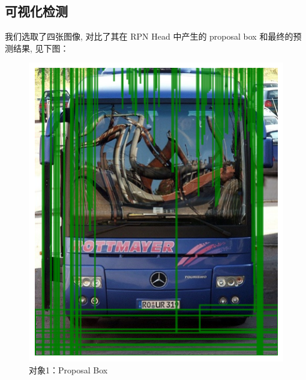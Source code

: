 \documentclass[notitlepage,cs4size,punct,oneside]{ctexrep}
\numberwithin{equation}{chapter}
\theoremstyle{mystyle}
\begin{document}
\subsection{可视化检测}
我们选取了四张图像, 对比了其在 RPN Head 中产生的 proposal box 和最终的预测结果, 见下图：
\begin{figure}[!htpb]
    \centering
    \begin{minipage}[t]{0.49\textwidth}
    \includegraphics[width=\linewidth]{1ppbox.png}
    \caption{对象1：Proposal Box}
    \label{mAPfrcnn}
    \end{minipage}
    \begin{minipage}[t]{0.49\textwidth}

\end{minipage}
\end{figure}
\end{document}
